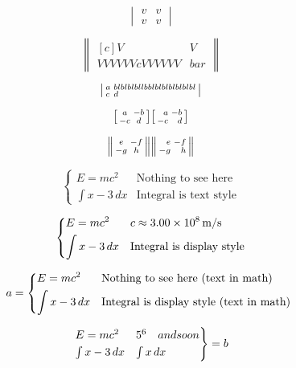\documentclass{article}
\newcommand{\horz}{\noindent\makebox[\linewidth]{\rule{\paperwidth}{0.4pt}}}
\begin{document}
\[
\begin{vmatrix*}
v & v \\
v & v
\end{vmatrix*}
\]

\[
\begin{Vmatrix*}[c]
V & V \\
VVVVVVcVVVVVV & bar
\end{Vmatrix*}
\]

\horz

\[
\begin{vsmallmatrix*}[l]
a & blblblbllbblblblblblblbl \\
c & d
\end{vsmallmatrix*}
\]

\[
\begin{bsmallmatrix} a & -b \\ -c & d \end{bsmallmatrix}
\begin{bsmallmatrix*}[r] a & -b \\ -c & d \end{bsmallmatrix*}
\]

\[
\begin{Vsmallmatrix} e & -f \\ -g & h \end{Vsmallmatrix}
\begin{Vsmallmatrix*}[r] e & -f \\ -g & h \end{Vsmallmatrix*}
\]

\horz

\[
\begin{cases}
E = m c^2 & \text{Nothing to see here} \\
\int x-3\, dx & \text{Integral is text style}
\end{cases}
\]

\[
\begin{dcases}
E = m c^2 & c \approx 3.00\times 10^{8}\,\mathrm{m}/\mathrm{s} \\
\int x-3\, dx & \text{Integral is display style}
\end{dcases}
\]

\[
a= \begin{dcases*}
E = m c^2 & Nothing to see here (text in math) \\
\int x-3\, dx & Integral is display style (text in math)
\end{dcases*}
\]

\[
\begin{rcases}
E = m c^2 & 5^6 \quad and so on \\
\int x-3\, dx & \int x \, dx
\end{rcases} = b
\]
\end{document}
